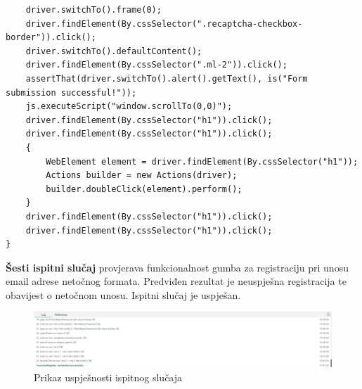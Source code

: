 \begin{lstlisting}
	driver.switchTo().frame(0);
	driver.findElement(By.cssSelector(".recaptcha-checkbox-border")).click();
	driver.switchTo().defaultContent();
	driver.findElement(By.cssSelector(".ml-2")).click();
	assertThat(driver.switchTo().alert().getText(), is("Form submission successful!"));
	js.executeScript("window.scrollTo(0,0)");
	driver.findElement(By.cssSelector("h1")).click();
	driver.findElement(By.cssSelector("h1")).click();
	{
		WebElement element = driver.findElement(By.cssSelector("h1"));
		Actions builder = new Actions(driver);
		builder.doubleClick(element).perform();
	}
	driver.findElement(By.cssSelector("h1")).click();
	driver.findElement(By.cssSelector("h1")).click();
}
			\end{lstlisting}

\textbf{Šesti ispitni slučaj} provjerava funkcionalnost gumba za registraciju pri unosu email adrese netočnog formata. Predviđen rezultat je neuspješna registracija te obavijest o netočnom unosu. Ispitni slučaj je uspješan.		

			\begin{figure} [hbt!]
	\includegraphics[width=\linewidth]{Slike/IncorrectRegister}
	\caption{Prikaz uspješnosti ispitnog slučaja}
			\end{figure}

